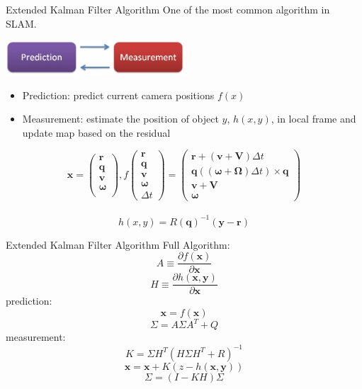 \documentclass{beamer}
\begin{document}
	\begin{frame}{Extended Kalman Filter Algorithm}
		One of the most common algorithm in SLAM.\\
		\uncover<2->
		{
			\begin{center}
				\includegraphics[width=0.5\textwidth]{./pics/ekf.jpg} 
			\end{center}
			\begin{itemize}
				\item Prediction: predict current camera positions \alert{$f(x)$}
				\item Measurement: estimate the position of object $y$, \alert{$h(x,y)$}, in local frame and update map based on the residual
			\end{itemize}
		}
		{
			\[
			\mathbf{x} = \left( 
			\begin{array}{c} 
				\mathbf{r}\\
				\mathbf{q}\\
				\mathbf{v}\\
				\mathbf{\omega}\\
			\end{array}
			\right),  
			f\left( 
			\begin{array}{c} 
				\mathbf{r}\\
				\mathbf{q}\\
				\mathbf{v}\\
				\mathbf{\omega}\\
				\Delta t
			\end{array} 
			\right) = 
			\left( 
			\begin{array}{c}
				\mathbf{r} + (\mathbf{v}+\mathbf{V})\Delta t\\
				\mathbf{q}((\mathbf{\omega}+\mathbf{\Omega})\Delta t) \times \mathbf{q}\\
				\mathbf{v} + \mathbf{V}\\
				\mathbf{\omega} 
			\end{array} 
			\right)
			\] \\

			\[ h(x,y) = R(\mathbf{q})^{-1}( \mathbf{y}-\mathbf{r} ) \]
		}
	\end{frame}

	\begin{frame}{Extended Kalman Filter Algorithm}
		Full Algorithm: \\
		\[ A \equiv \frac{ \partial f(\mathbf{x}) }{ \partial \mathbf{x} } \]
		\[ H \equiv \frac{ \partial h(\mathbf{x},\mathbf{y}) }{ \partial \mathbf{x} } \]
		prediction:\\
		\[\mathbf{x} = f(\mathbf{x})\]
		\[\Sigma = A\Sigma A^{T} + Q\]
		measurement:\\
		\[K = \Sigma H^{T}(H\Sigma H^{T}+R)^{-1}\]
		\[\mathbf{x} = \mathbf{x}+K(z-h(\mathbf{x},\mathbf{y}))\]
		\[\Sigma = (I-KH)\Sigma\]

	\end{frame}
\end{document}
